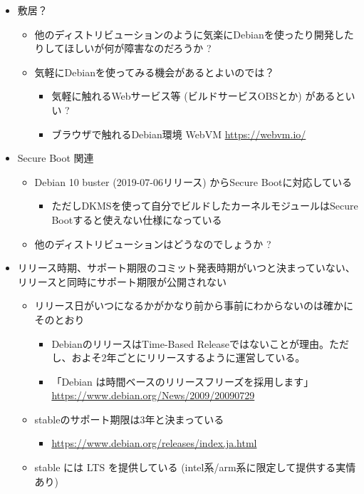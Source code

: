 \documentclass[mingoth,a4paper]{jsarticle}
\begin{document}
\begin{itemize}
\item 敷居？
  \begin{itemize}
  \item 他のディストリビューションのように気楽にDebianを使ったり開発したりしてほしいが何が障害なのだろうか ?
  \item 気軽にDebianを使ってみる機会があるとよいのでは？
    \begin{itemize}
    \item 気軽に触れるWebサービス等 (ビルドサービスOBSとか) があるといい ?
    \item ブラウザで触れるDebian環境 WebVM \url{https://webvm.io/}
    \end{itemize}
  \end{itemize}
\item Secure Boot 関連
  \begin{itemize}
  \item Debian 10 buster (2019-07-06リリース) からSecure Bootに対応している
    \begin{itemize}
    \item ただしDKMSを使って自分でビルドしたカーネルモジュールはSecure Bootすると使えない仕様になっている
    \end{itemize}
  \item 他のディストリビューションはどうなのでしょうか ?
  \end{itemize}
\item リリース時期、サポート期限のコミット発表時期がいつと決まっていない、リリースと同時にサポート期限が公開されない
  \begin{itemize}
  \item リリース日がいつになるかがかなり前から事前にわからないのは確かにそのとおり
    \begin{itemize}
    \item DebianのリリースはTime-Based Releaseではないことが理由。ただし、およそ2年ごとにリリースするように運営している。
    \item 「Debian は時間ベースのリリースフリーズを採用します」 \url{https://www.debian.org/News/2009/20090729}
    \end{itemize}
  \item stableのサポート期限は3年と決まっている
    \begin{itemize}
    \item \url{https://www.debian.org/releases/index.ja.html}
    \end{itemize}
  \item stable には LTS を提供している (intel系/arm系に限定して提供する実情あり)

\end{itemize}
\end{itemize}
\end{document}
